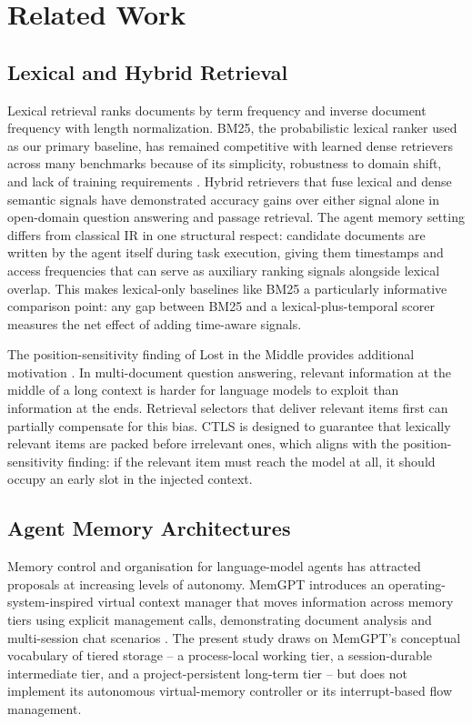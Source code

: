 \section{Related Work}

\label{sec:related_work}

\subsection{Lexical and Hybrid Retrieval}

Lexical retrieval ranks documents by term frequency and inverse document frequency with length normalization. BM25, the probabilistic lexical ranker used as our primary baseline, has remained competitive with learned dense retrievers across many benchmarks because of its simplicity, robustness to domain shift, and lack of training requirements \citep{ref_9dbf664b6954efbc}. Hybrid retrievers that fuse lexical and dense semantic signals have demonstrated accuracy gains over either signal alone in open-domain question answering and passage retrieval. The agent memory setting differs from classical IR in one structural respect: candidate documents are written by the agent itself during task execution, giving them timestamps and access frequencies that can serve as auxiliary ranking signals alongside lexical overlap. This makes lexical-only baselines like BM25 a particularly informative comparison point: any gap between BM25 and a lexical-plus-temporal scorer measures the net effect of adding time-aware signals.

The position-sensitivity finding of Lost in the Middle provides additional motivation \citep{ref_9dbf664b6954efbc}. In multi-document question answering, relevant information at the middle of a long context is harder for language models to exploit than information at the ends. Retrieval selectors that deliver relevant items first can partially compensate for this bias. CTLS is designed to guarantee that lexically relevant items are packed before irrelevant ones, which aligns with the position-sensitivity finding: if the relevant item must reach the model at all, it should occupy an early slot in the injected context.

\subsection{Agent Memory Architectures}

Memory control and organisation for language-model agents has attracted proposals at increasing levels of autonomy. MemGPT introduces an operating-system-inspired virtual context manager that moves information across memory tiers using explicit management calls, demonstrating document analysis and multi-session chat scenarios \citep{ref_959d6858d034c6e1}. The present study draws on MemGPT's conceptual vocabulary of tiered storage -- a process-local working tier, a session-durable intermediate tier, and a project-persistent long-term tier -- but does not implement its autonomous virtual-memory controller or its interrupt-based flow management.

